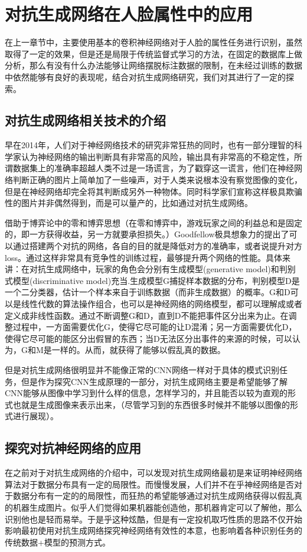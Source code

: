 \chapter{对抗生成网络在人脸属性中的应用}
在上一章节中，主要使用基本的卷积神经网络对于人脸的属性任务进行识别，虽然取得了一定的效果，但是还是局限于传统监督式学习的方法，在固定的数据库上做分析，那么有没有什么办法能够让网络摆脱标注数据的限制，在未经过训练的数据中依然能够有良好的表现呢，结合对抗生成网络研究，我们对其进行了一定的探索。
\section{对抗生成网络相关技术的介绍}
早在2014年，人们对于神经网络技术的研究非常狂热的同时，也有一部分理智的科学家认为神经网络的输出判断具有非常高的风险，输出具有非常高的不稳定性，所谓数据集上的准确率超越人类不过是一场谎言，为了戳穿这一谎言，他们在神经网络判断正确的图片上简单加了一些噪声，对于人类来说根本没有察觉图像的变化，但是在神经网络却完全将其判断成另外一种物体。同时科学家们宣称这样极具欺骗性的图片并非偶然得到，而是可以量产的，比如通过对抗生成网络。

借助于博弈论中的零和博弈思想（在零和博弈中，游戏玩家之间的利益总和是固定的，即一方获得收益，另一方就要承担损失。）Goodfellow极具想象力的提出了可以通过搭建两个对抗的网络，各自的目的就是降低对方的准确率，或者说提升对方loss。通过这样非常具有竞争性的训练过程，最够提升两个网络的性能。具体来讲：在对抗生成网络中，玩家的角色会分别有生成模型(generative model)和判别式模型(discriminative model)充当.生成模型G捕捉样本数据的分布，判别模型D是一个二分类器，估计一个样本来自于训练数据（而非生成数据）的概率。G和D可以是线性代数的算法操作组合，也可以是神经网络的网络模型，都可以理解成或者定义成非线性函数。通过不断调整G和D，直到D不能把事件区分出来为止。在调整过程中，一方面需要优化G，使得它尽可能的让D混淆；另一方面需要优化D，使得它尽可能的能区分出假冒的东西；当D无法区分出事件的来源的时候，可以认为，G和M是一样的。从而，就获得了能够以假乱真的数据。

但是对抗生成网络很明显并不能像正常的CNN网络一样对于具体的模式识别任务，但是作为探究CNN生成原理的一部分，对抗生成网络主要是希望能够了解CNN能够从图像中学习到什么样的信息，怎样学习的，并且能否以较为直观的形式也就是生成图像来表示出来，（尽管学习到的东西很多时候并不能够以图像的形式进行展现）。
\section{探究对抗神经网络的应用}
在之前对于对抗生成网络的介绍中，可以发现对抗生成网络最初是来证明神经网络算法对于数据分布具有一定的局限性。而慢慢发展，人们并不在乎神经网络是否对于数据分布有一定的的局限性，而狂热的希望能够通过对抗生成网络获得以假乱真的机器生成图片。似乎人们觉得如果机器能创造他，那机器肯定可以了解他，那么识别他也是轻而易举。于是乎这种炫酷，但是有一定投机取巧性质的思路不仅开始影响最初使用对抗生成网络探究神经网络有效性的本意，也影响着各种识别任务的传统数据+模型的预测方式。


